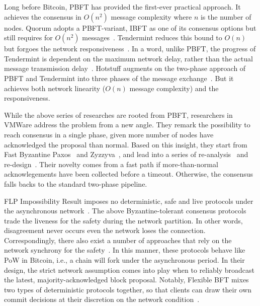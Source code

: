 Long before Bitcoin, PBFT has provided the first-ever practical approach.
It achieves the consensus in $O(n^2)$ message complexity where $n$ is the number of nodes. 
Quorum adopts a PBFT-variant, IBFT as one of its consensus options but still requires for $O(n^2)$ messages~\cite{saltini2019correctness}. 
Tendermint reduces this bound to $O(n)$ but forgoes the network responsiveness~\cite{buchman2016tendermint}. 
In a word, unlike PBFT, the progress of Tendermint is dependent on the maximum network delay, rather than the actual message transmission delay~\cite{amoussou2019dissecting}. 
Hotstuff augments on the two-phase approach of PBFT and Tendermint into three phases of the message exchange~\cite{yin2019hotstuff}. 
But it achieves both network linearity ($O(n)$ message complexity) and the responsiveness. 

While the above series of researches are rooted from PBFT, researchers in VMWare address the problem from a new angle. 
They remark the possibility to reach consensus in a single phase, given more number of nodes have acknowledged the proposal than normal. 
Based on this insight, they start from Fast Byzantine Paxos~\cite{martin2006fast} and Zyzzyva~\cite{gueta2019sbft}, and lead into a series of re-analysis~\cite{abraham2017revisiting} and re-design~\cite{abraham2018revisiting, gueta2019sbft}. 
Their novelty comes from a fast path if more-than-normal acknowlegements have been collected before a timeout. 
Otherwise, the consensus falls backs to the standard two-phase pipeline.  

FLP Impossibility Result imposes no deterministic, safe and live protocols under the asynchronous network~\cite{fischer1985impossibility}. 
The above Byzantine-tolerant consensus protocols trade the liveness for the safety during the network partition. 
In other words, disagreement never occurs even the network loses the connection. 
Correspondingly, there also exist a number of approaches that rely on the network synchrony for the safety~\cite{abraham2020sync,abraham2017efficient}. 
In this manner, these protocols behave like PoW in Bitcoin, i.e., a chain will fork under the asynchronous period. 
In their design, the strict network assumption comes into play when to reliably broadcast the latest, majority-acknowledged block proposal. 
Notably, Flexible BFT mixes two types of deterministic protocols together, so that clients can draw their own commit decisions at their discretion on the network condition~\cite{malkhi2019flexible}. 

